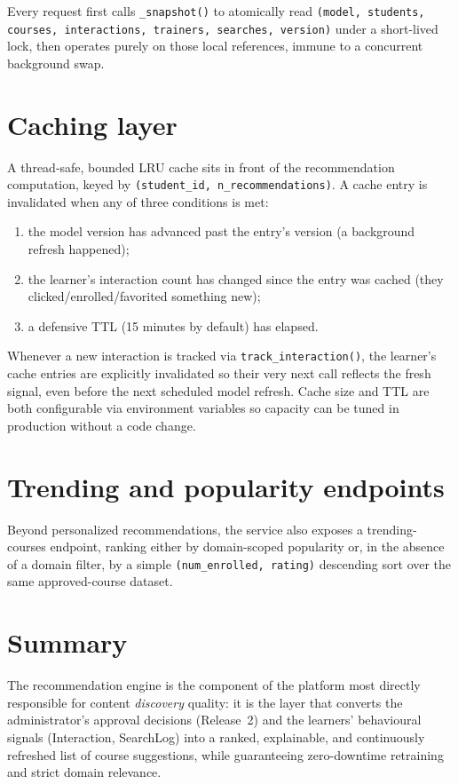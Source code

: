 \documentclass[a4paper,12pt]{report}
\begin{document}
Every request first calls \texttt{\_snapshot()} to atomically read
\texttt{(model, students, courses, interactions, trainers, searches,
version)} under a short-lived lock, then operates purely on those local
references, immune to a concurrent background swap.

\section{Caching layer}
A thread-safe, bounded LRU cache sits in front of the recommendation
computation, keyed by \texttt{(student\_id, n\_recommendations)}. A cache
entry is invalidated when any of three conditions is met:
\begin{enumerate}[leftmargin=*]
  \item the model version has advanced past the entry's version (a
        background refresh happened);
  \item the learner's interaction count has changed since the entry was
        cached (they clicked/enrolled/favorited something new);
  \item a defensive TTL (15 minutes by default) has elapsed.
\end{enumerate}
Whenever a new interaction is tracked via \texttt{track\_interaction()},
the learner's cache entries are explicitly invalidated so their very next
call reflects the fresh signal, even before the next scheduled model
refresh. Cache size and TTL are both configurable via environment
variables so capacity can be tuned in production without a code change.

\section{Trending and popularity endpoints}
Beyond personalized recommendations, the service also exposes a trending-
courses endpoint, ranking either by domain-scoped popularity or, in the
absence of a domain filter, by a simple \texttt{(num\_enrolled, rating)}
descending sort over the same approved-course dataset.

\section{Summary}
The recommendation engine is the component of the platform most directly
responsible for content \emph{discovery} quality: it is the layer that
converts the administrator's approval decisions (Release~2) and the
learners' behavioural signals (Interaction, SearchLog) into a ranked,
explainable, and continuously refreshed list of course suggestions, while
guaranteeing zero-downtime retraining and strict domain relevance.
\end{document}
